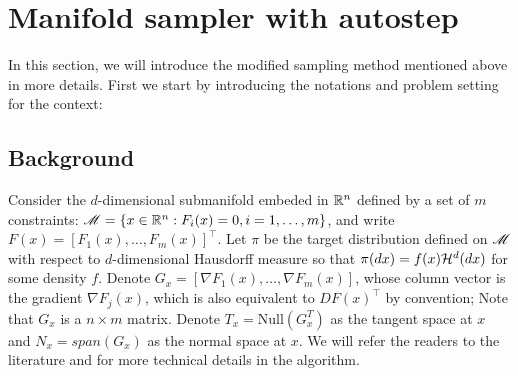 \documentclass{article}
\begin{document}


\section{Manifold sampler with autostep}
In this section, we will introduce the modified sampling method mentioned above in more details. First we start by introducing the notations and problem setting for the context:
\subsection{Background}
Consider the $d$-dimensional submanifold embeded in $\mathbb R^n$ defined by a set of $m$ constraints: $\mathscr{M} = \{x \in \mathbb R^n : F_i(x) = 0, i = 1,\ldots, m\}$, and write $F(x) = [F_1(x),\ldots, F_m(x)]^\top$. Let $\pi$ be the target distribution defined on $\mathscr{M}$ with respect to $d$-dimensional Hausdorff measure so that $\pi(dx) = f(x) {\cal H}^{d}(dx)$ for some density $f$.
Denote $G_x = [\nabla F_1(x), \ldots, \nabla F_m(x)]$, whose column vector is the gradient $\nabla F_j(x)$, which is also equivalent to $DF(x)^\top$ by convention; Note that $G_x$ is a $n \times m$ matrix. Denote $T_x = \text{Null}(G_x^T)$ as the tangent space at $x$ and $N_x = span(G_x)$ as the normal space at $x$. We will refer the readers to the literature \cite{manifoldparent} and \cite{manifoldchild} for more technical details in the algorithm.
\end{document}
